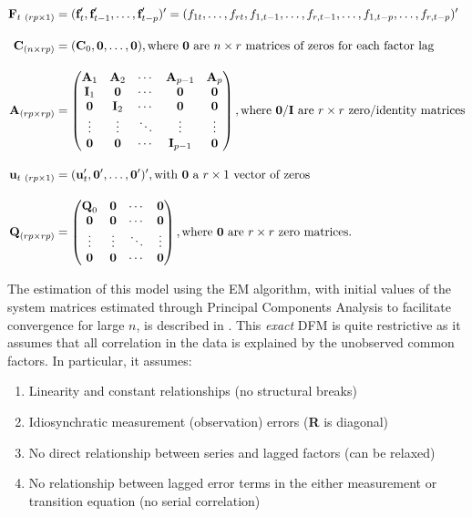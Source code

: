 \documentclass[a4paper]{article}
\begin{document}
\begin{align}
\textbf{F}_{t\ (rp \times 1)}  &= (\textbf{f}_t', \textbf{f}_{t-1}', \dots, \textbf{f}_{t-p}')' = (f_{1t}, \dots, f_{rt}, f_{1,t-1}, \dots, f_{r,t-1}, \dots, f_{1,t-p}, \dots, f_{r,t-p})' \\[1em]
\textbf{C}_{(n \times rp)}  &= (\textbf{C}_0, \textbf{0}, \dots, \textbf{0}), \text{where \textbf{0} are $n\times r$ matrices of zeros for each factor lag} \\[1em]
\textbf{A}_{(rp \times rp)}  &= \begin{pmatrix}
\textbf{A}_1 & \textbf{A}_2 & \cdots & \textbf{A}_{p-1}  & \textbf{A}_p \\
\textbf{I}_1 & \textbf{0} & \cdots & \textbf{0} & \textbf{0} \\
\textbf{0} & \textbf{I}_2 & \cdots & \textbf{0} & \textbf{0} \\ 
\vdots & \vdots & \ddots & \vdots & \vdots \\
\textbf{0} & \textbf{0} & \cdots & \textbf{I}_{p-1} & \textbf{0}
\end{pmatrix}, \text{where \textbf{0}/\textbf{I} are $r\times r$ zero/identity matrices} \\[1em]
\textbf{u}_{t\ (rp \times 1)}  &= (\textbf{u}_t', \textbf{0}', \dots, \textbf{0}')', \text{with \textbf{0} a $r \times 1$ vector of zeros}  \\[1em]
\textbf{Q}_{(rp \times rp)}  &= \begin{pmatrix}
\textbf{Q}_0 & \textbf{0} & \cdots & \textbf{0} \\
\textbf{0} & \textbf{0}& \cdots & \textbf{0} \\ 
\vdots & \vdots & \ddots & \vdots  \\
\textbf{0} & \textbf{0} & \cdots & \textbf{0}
\end{pmatrix}, \text{where \textbf{0} are $r\times r$ zero matrices.} 
\end{align}

The estimation of this model using the EM algorithm, with initial values of the system matrices estimated through Principal Components Analysis to facilitate convergence for large $n$, is described in \citet{doz2012quasi}. This \emph{exact} DFM is quite restrictive as it assumes that all correlation in the data is explained by the unobserved common factors. In particular, it assumes:

\begin{enumerate}
\item Linearity and constant relationships (no structural breaks)
\item Idiosynchratic measurement (observation) errors (\textbf{R} is diagonal)
\item No direct relationship between series and lagged factors (can be relaxed)
\item No relationship between lagged error terms in the either measurement or transition equation (no serial correlation)
\end{enumerate}
\end{document}
